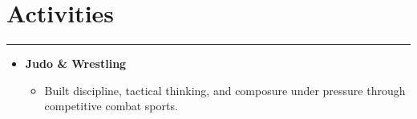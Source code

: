 \documentclass[letterpaper, 10pt]{article}
\begin{document}
\section*{Activities}
\hrule
\vspace{4pt}
\begin{itemize}
    \item[] \textbf{Judo \& Wrestling}
        \begin{itemize}
            \item Built discipline, tactical thinking, and composure under pressure through competitive combat sports.
        \end{itemize}
\end{itemize}

\end{document}
